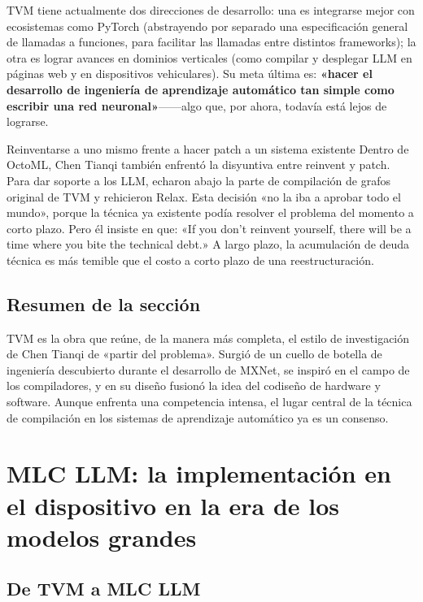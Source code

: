 \documentclass[a4paper]{article}
\begin{document}
TVM tiene actualmente dos direcciones de desarrollo: una es integrarse mejor con ecosistemas como PyTorch (abstrayendo por separado una especificación general de llamadas a funciones, para facilitar las llamadas entre distintos frameworks); la otra es lograr avances en dominios verticales (como compilar y desplegar LLM en páginas web y en dispositivos vehiculares). Su meta última es: \textbf{«hacer el desarrollo de ingeniería de aprendizaje automático tan simple como escribir una red neuronal»}------algo que, por ahora, todavía está lejos de lograrse.

\begin{warningbox}{Reinventarse a uno mismo frente a hacer patch a un sistema existente}
Dentro de OctoML, Chen Tianqi también enfrentó la disyuntiva entre reinvent y patch. Para dar soporte a los LLM, echaron abajo la parte de compilación de grafos original de TVM y rehicieron Relax. Esta decisión «no la iba a aprobar todo el mundo», porque la técnica ya existente podía resolver el problema del momento a corto plazo. Pero él insiste en que: «If you don't reinvent yourself, there will be a time where you bite the technical debt.» A largo plazo, la acumulación de deuda técnica es más temible que el costo a corto plazo de una reestructuración.
\end{warningbox}

\subsection{Resumen de la sección}

TVM es la obra que reúne, de la manera más completa, el estilo de investigación de Chen Tianqi de «partir del problema». Surgió de un cuello de botella de ingeniería descubierto durante el desarrollo de MXNet, se inspiró en el campo de los compiladores, y en su diseño fusionó la idea del codiseño de hardware y software. Aunque enfrenta una competencia intensa, el lugar central de la técnica de compilación en los sistemas de aprendizaje automático ya es un consenso.
\section{MLC LLM: la implementación en el dispositivo en la era de los modelos grandes}

\subsection{De TVM a MLC LLM}
\end{document}
